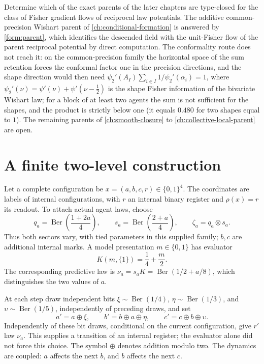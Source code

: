 Determine which of the exact parents of the later chapters are type-closed
for the class of Fisher gradient flows of reciprocal law potentials. The
additive common-precision Wishart parent of \cref{ch:conditional-formation}
is answered by \cref{form:parent}, which identifies the descended field with
the unit-Fisher flow of the parent reciprocal potential by direct
computation. The conformality route does not reach it: on the
common-precision family the horizontal space of the sum retention forces the
conformal factor one in the precision directions, and the shape direction
would then need $\psi_2'(A_I)\sum_{i\in I}1/\psi_2'(\alpha_i)=1$, where
$\psi_2'(\nu)=\psi'(\nu)+\psi'(\nu-\tfrac12)$ is the shape Fisher
information of the bivariate Wishart law; for a block of at least two
agents the sum is not sufficient for the shapes, and the product is
strictly below one (it equals $0.480$ for two shapes equal to $1$). The
remaining parents of \cref{ch:smooth-closure} to
\cref{ch:collective-local-parent} are open.

\section{A finite two-level construction}

Let a complete configuration be $x=(a,b,c,r)\in\{0,1\}^4$. The coordinates
are labels of internal configurations, with $r$ an internal binary register
and $\rho(x)=r$ its readout. To attach actual agent laws, choose
\begin{equation}
 q_a=\operatorname{Ber}\left(\frac{1+2a}{4}\right),\qquad
 s_a=\operatorname{Ber}\left(\frac{2+a}{4}\right),\qquad
 \zeta_a=q_a\otimes s_a.
 \label{inh:finite-laws}
\end{equation}
Thus both sectors vary, with tied parameters in this supplied family;
$b,c$ are additional internal marks. A model presentation $m\in\{0,1\}$
has evaluator
\begin{equation}
 K(m,\{1\})=\frac14+\frac m2.
\end{equation}
The corresponding predictive law is
$\nu_a=s_aK=\operatorname{Ber}(1/2+a/8)$, which distinguishes the two
values of $a$.

At each step draw independent bits
$\xi\sim\operatorname{Ber}(1/4)$,
$\eta\sim\operatorname{Ber}(1/3)$, and
$\upsilon\sim\operatorname{Ber}(1/5)$, independently of preceding
draws, and set
\begin{equation}
 a'=a\mathbin\oplus\xi,\qquad
 b'=b\mathbin\oplus a\mathbin\oplus\eta,\qquad
 c'=c\mathbin\oplus b\mathbin\oplus\upsilon.
 \label{inh:finite-dynamics}
\end{equation}
Independently of these bit draws, conditional on the current configuration,
give $r'$ law $\nu_a$. This supplies a transition of an internal register;
the evaluator alone did not force this choice. The symbol $\oplus$ denotes
addition modulo two. The dynamics are coupled:
$a$ affects the next $b$, and $b$ affects the next $c$.

